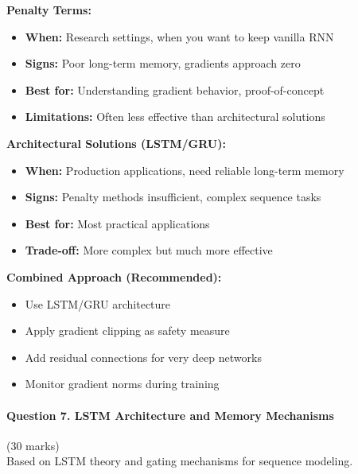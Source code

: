 \documentclass[12pt]{article}
\begin{document}
\begin{enumerate}[(a)]
{    \textbf{Penalty Terms:}
    \begin{itemize}
        \item \textbf{When:} Research settings, when you want to keep vanilla RNN
        \item \textbf{Signs:} Poor long-term memory, gradients approach zero
        \item \textbf{Best for:} Understanding gradient behavior, proof-of-concept
        \item \textbf{Limitations:} Often less effective than architectural solutions
    \end{itemize}
    
    \textbf{Architectural Solutions (LSTM/GRU):}
    \begin{itemize}
        \item \textbf{When:} Production applications, need reliable long-term memory
        \item \textbf{Signs:} Penalty methods insufficient, complex sequence tasks
        \item \textbf{Best for:} Most practical applications
        \item \textbf{Trade-off:} More complex but much more effective
    \end{itemize}
    
    \textbf{Combined Approach (Recommended):}
    \begin{itemize}
        \item Use LSTM/GRU architecture
        \item Apply gradient clipping as safety measure
        \item Add residual connections for very deep networks
        \item Monitor gradient norms during training
    \end{itemize}
    }
\end{enumerate}

\newpage
\paragraph{Question 7. LSTM Architecture and Memory Mechanisms}\hfill (30 marks)\\
Based on LSTM theory and gating mechanisms for sequence modeling.
\end{document}
